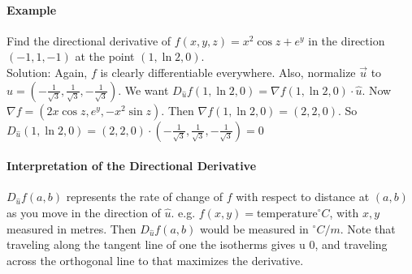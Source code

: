 \documentclass[tikz,10pt,letter]{article}
\theoremstyle{plain}
\theoremstyle{definition}
\begin{document}
\paragraph{Example}
Find the directional derivative of $f(x,y,z)=x^2\cos z+e^y$ in the direction $(-1,1,-1)$ at the point $(1,\ln2,0)$. \\ 
Solution: Again, $f$ is clearly differentiable everywhere. Also, normalize $\vec{u}$ to $\hat{u}=\left(-\frac{1}{\sqrt{3}},\frac{1}{\sqrt{3}},-\frac{1}{\sqrt{3}}\right)$. We want $D_{\hat{u}}f(1,\ln2,0)=\nabla f(1,\ln2,0)\cdot\hat{u}$. Now $\nabla f=(2x\cos z,e^y, -x^2\sin z)$. Then $\nabla f(1,\ln2,0)=(2,2,0)$. So $D_{\hat{u}}(1,\ln2,0)=(2,2,0)\cdot\left(-\frac{1}{\sqrt{3}},\frac{1}{\sqrt{3}},-\frac{1}{\sqrt{3}}\right)=0$
\paragraph{Interpretation of the Directional Derivative}
$D_{\hat{u}}f(a,b)$ represents the rate of change of $f$ with respect to distance at $(a,b)$ as you move in the direction of $\hat{u}$. e.g. $f(x,y)=\text{temperature}^\circ C$, with $x,y$ measured in metres. Then $D_{\hat{u}}f(a,b)$ would be measured in $^\circ C/m$. Note that traveling along the tangent line of one the isotherms gives u 0, and traveling across the orthogonal line to that maximizes the derivative.
\end{document}
